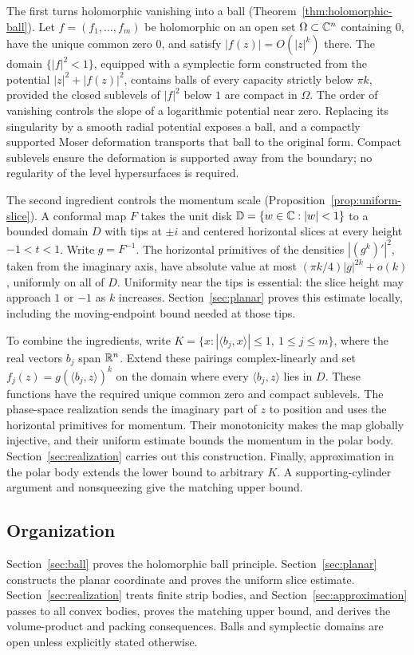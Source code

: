 The first turns holomorphic vanishing into a ball
(Theorem~\ref{thm:holomorphic-ball}). Let $f=(f_1,\ldots,f_m)$ be holomorphic on an open set
$\Omega\subset\mathbb C^n$ containing $0$, have the unique common zero $0$,
and satisfy
$|f(z)|=O(|z|^k)$ there. The domain $\{|f|^2<1\}$, equipped with a symplectic form
constructed from the potential $|z|^2+|f(z)|^2$, contains balls of every
capacity strictly below $\pi k$, provided the closed sublevels of
$|f|^2$ below $1$ are compact in $\Omega$. The order of vanishing controls the
slope of a logarithmic potential near zero. Replacing its singularity
by a smooth radial potential exposes a ball, and a compactly supported
Moser deformation transports that ball to the original form.
Compact sublevels ensure the deformation is supported away from the
boundary; no regularity of the level hypersurfaces is required.

The second ingredient controls the momentum scale
(Proposition~\ref{prop:uniform-slice}). A conformal map $F$ takes the unit
disk $\mathbb D=\{w\in\mathbb C:|w|<1\}$ to a bounded domain $D$ with tips at $\pm i$
and centered horizontal slices at every height $-1<t<1$.
Write $g=F^{-1}$. The horizontal primitives of the densities
$|(g^k)'|^2$, taken from the imaginary axis, have absolute value at most
$(\pi k/4)|g|^{2k}+o(k)$, uniformly on all of $D$. Uniformity near the tips is essential:
the slice height may approach $1$ or $-1$ as $k$ increases.
Section~\ref{sec:planar} proves this estimate locally, including the
moving-endpoint bound needed at those tips.

To combine the ingredients, write
$K=\{x:|\langle b_j,x\rangle|\le1,\ 1\le j\le m\}$, where the real
vectors $b_j$ span $\mathbb R^n$. Extend these pairings complex-linearly and
set $f_j(z)=g(\langle b_j,z\rangle)^k$ on the domain where every
$\langle b_j,z\rangle$ lies in $D$. These functions have the required
unique common zero and compact sublevels. The phase-space realization
sends the imaginary part of $z$ to position and uses the horizontal
primitives for momentum. Their monotonicity makes the map globally
injective, and their uniform estimate bounds the momentum in the polar
body. Section~\ref{sec:realization} carries out this construction.
Finally, approximation in the polar body extends the lower bound to
arbitrary $K$. A supporting-cylinder argument and nonsqueezing give
the matching upper bound.

\subsection*{Organization}

Section~\ref{sec:ball} proves the holomorphic ball principle.
Section~\ref{sec:planar} constructs the planar coordinate and proves the
uniform slice estimate. Section~\ref{sec:realization} treats finite strip
bodies, and Section~\ref{sec:approximation} passes to all convex bodies,
proves the matching upper bound, and derives the volume-product and
packing consequences.
Balls and symplectic domains are open unless explicitly stated otherwise.
